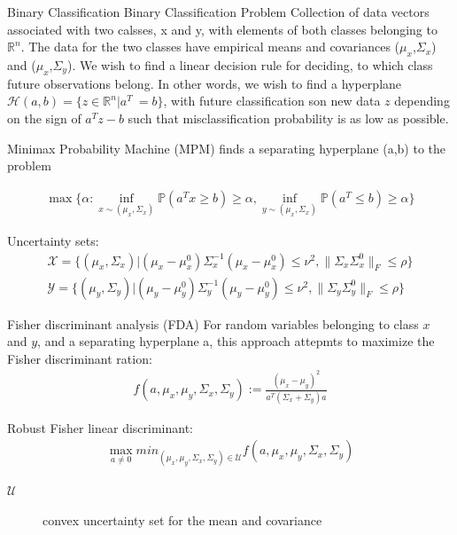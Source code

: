 \documentclass{beamer}
\begin{document}
\begin{frame}{Binary Classification}
Binary Classification Problem
Collection of data vectors associated with two calsses, x and y, with elements of both classes belonging to $\mathbb{R}^{n}$. The data for the two classes have empirical means and covariances
($\mu_{x}$,$\Sigma_{x}$) and ($\mu_{x}$,$\Sigma_{y}$). We wish to find a linear decision rule for deciding, to which class future observations belong. In other words, we wish to find a hyperplane $\mathcal{H}(a,b) = \{z \in \mathbb{R}^{n} | a^{T}\ = b\}$, with future classification son new data $z$ depending on the sign of $a^{T}z - b$ such that misclassification probability is as low as possible.

Minimax Probability Machine (MPM) finds a separating hyperplane (a,b) to the problem

\begin{align*}
\max \{\alpha : \inf_{x \sim (\mu_{x}, \Sigma_{x}) }
\mathbb{P}(a^{T}x \geq b) \geq \alpha,
\inf_{y \sim (\mu_{x}, \Sigma_{x})} \mathbb{P}(a^{T} \leq b) \geq \alpha \}
\end{align*}

Uncertainty sets:
\begin{align*}
\mathcal{X} = \{(\mu_{x}, \Sigma_{x}) |(\mu_{x} - \mu_{x}^{0})\Sigma^{-1}_{x}(\mu_{x} - \mu_{x}^{0}) \leq \nu^{2}, \lVert \Sigma_{x} \Sigma_{x}^{0} \rVert_{F} \leq \rho\} \\
\mathcal{Y} = \{(\mu_{y}, \Sigma_{y}) |(\mu_{y} - \mu_{y}^{0})\Sigma^{-1}_{y}(\mu_{y} - \mu_{y}^{0}) \leq \nu^{2}, \lVert \Sigma_{y} \Sigma_{y}^{0} \rVert_{F} \leq \rho\}
\end{align*}

\end{frame}

\begin{frame}{Fisher discriminant analysis (FDA)}
For random variables belonging to class $x$ and $y$, and a separating hyperplane a, this approach attepmts to maximize the Fisher discriminant ration:
\begin{align*}
f(a, \mu_{x}, \mu_{y}, \Sigma_{x}, \Sigma_{y}) := \frac{(\mu_{x} - \mu_{y})^{2}}{a^{T}(\Sigma_{x} + \Sigma_{y})a}
\end{align*}

Robust Fisher linear discriminant:
\begin{align*}
\max_{a \neq 0} min_{(\mu_{x}, \mu_{y}, \Sigma_{x}, \Sigma_{y}) \in \mathcal{U}} f(a, \mu_{x}, \mu_{y}, \Sigma_{x}, \Sigma_{y})
\end{align*}
\begin{description}
\item [$\mathcal{U}$] convex uncertainty set for the mean and covariance
\end{description}
\end{frame}
\end{document}
